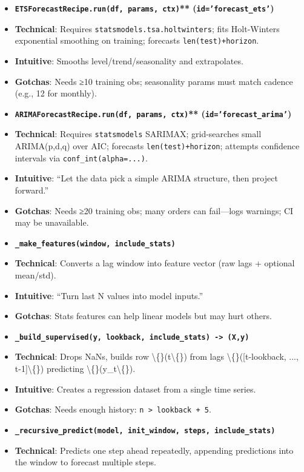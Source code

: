 \documentclass[11pt]{article}
\begin{document}
\begin{itemize}[leftmargin=*,nosep]
\item \textbf{\texttt{ETSForecastRecipe.run(df, params, ctx)}** (\texttt{id='forecast\_ets'})}
\item \textbf{Technical}: Requires \texttt{statsmodels.tsa.holtwinters}; fits Holt-Winters exponential smoothing on training; forecasts \texttt{len(test)+horizon}.
\item \textbf{Intuitive}: Smooths level/trend/seasonality and extrapolates.
\item \textbf{Gotchas}: Needs ≥10 training obs; seasonality params must match cadence (e.g., 12 for monthly).
\item \textbf{\texttt{ARIMAForecastRecipe.run(df, params, ctx)}** (\texttt{id='forecast\_arima'})}
\item \textbf{Technical}: Requires \texttt{statsmodels} SARIMAX; grid-searches small ARIMA(p,d,q) over AIC; forecasts \texttt{len(test)+horizon}; attempts confidence intervals via \texttt{conf\_int(alpha=...)}.
\item \textbf{Intuitive}: “Let the data pick a simple ARIMA structure, then project forward.”
\item \textbf{Gotchas}: Needs ≥20 training obs; many orders can fail—logs warnings; CI may be unavailable.
\item \textbf{\texttt{\_make\_features(window, include\_stats)}}
\item \textbf{Technical}: Converts a lag window into feature vector (raw lags + optional mean/std).
\item \textbf{Intuitive}: “Turn last N values into model inputs.”
\item \textbf{Gotchas}: Stats features can help linear models but may hurt others.
\item \textbf{\texttt{\_build\_supervised(y, lookback, include\_stats) -> (X,y)}}
\item \textbf{Technical}: Drops NaNs, builds row \textbackslash\{\}(t\textbackslash\{\}) from lags \textbackslash\{\}([t-lookback, ..., t-1]\textbackslash\{\}) predicting \textbackslash\{\}(y\_t\textbackslash\{\}).
\item \textbf{Intuitive}: Creates a regression dataset from a single time series.
\item \textbf{Gotchas}: Needs enough history: \texttt{n > lookback + 5}.
\item \textbf{\texttt{\_recursive\_predict(model, init\_window, steps, include\_stats)}}
\item \textbf{Technical}: Predicts one step ahead repeatedly, appending predictions into the window to forecast multiple steps.

\end{itemize}
\end{document}
